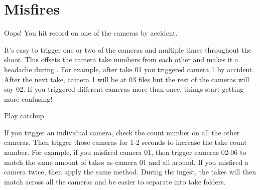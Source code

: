 \chapter{Misfires}
\pagecolor{white}
\label{chap:20}
\begin{fullwidth}


\problem

{\large Oops! You hit record on one of the cameras by accident. \par}

It’s easy to trigger one or two of the cameras and multiple times throughout the shoot. This offsets the camera take numbers from each other and makes it a headache during \textbf{}. For example, after take 01 you triggered camera 1 by accident. After the next take, camera 1 will be  at 03 files but the rest of the cameras will say 02. If you triggered different cameras more than once, things start getting more confusing!


\clearpage
\solution

{\large Play catchup. \par}

If you trigger an individual camera, check the count number on all the other cameras. Then trigger those cameras for 1-2 seconds to increase the take count number. For example, if you misfired camera 01, then trigger cameras 02-06 to match the same amount of takes as camera 01 and all around. If you misfired a camera twice, then apply the same method. During the ingest, the takes will then match across all the cameras and be easier to separate into take folders.  



\clearpage
\end{fullwidth}

